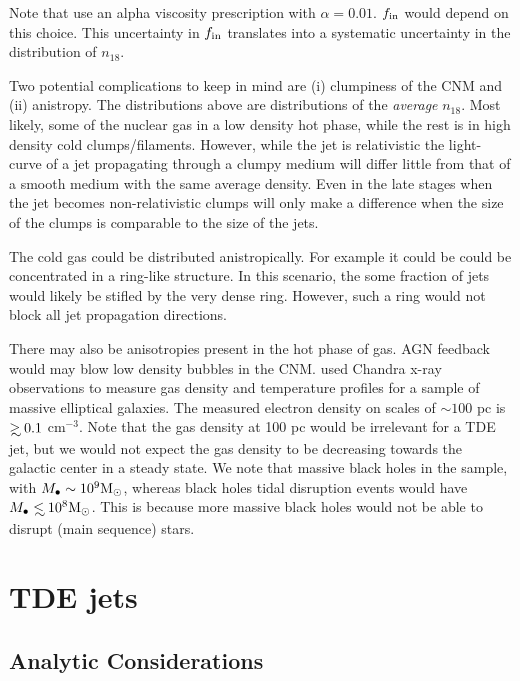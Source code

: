 \documentclass[usenatbib,fleqn]{mnras}
\newcommand\lsim{\mathrel{\rlap{\lower4pt\hbox{\hskip1pt$\sim$}}
    \raise1pt\hbox{$<$}}}
\newcommand\gsim{\mathrel{\rlap{\lower4pt\hbox{\hskip1pt$\sim$}}
    \raise1pt\hbox{$>$}}}
\newcommand{\Mbh}[1][]{M_{\bullet#1}}
\newcommand{\Msun}{{\rm M_\odot}}
\begin{document}
Note that \citet{Li+2013} use an alpha viscosity prescription with
$\alpha=0.01$.  $f_{\rm in}$ would depend on this choice. This
uncertainty in $f_{\rm in}$ translates into a systematic uncertainty
in the distribution of $n_{18}$. 
 
Two potential complications to keep in mind are (i) clumpiness of the
CNM and (ii) anistropy. The distributions above are distributions of
the {\it average} $n_{18}$.  Most likely, some of the nuclear gas in a
low density hot phase, while the rest is in high density cold
clumps/filaments.  However, while the jet is relativistic the
light-curve of a jet propagating through a clumpy medium will differ
little from that of a smooth medium with the same average
density. Even in the late stages when the jet becomes non-relativistic
clumps will only make a difference when the size of the clumps is
comparable to the size of the jets.

The cold gas could be distributed anistropically. For example it could
be could be concentrated in a ring-like structure. In this scenario,
the some fraction of jets would likely be stifled by the very dense
ring. However, such a ring would not block all jet propagation
directions. 

There may also be anisotropies present in the hot phase of gas. AGN
feedback would may blow low density bubbles in the
CNM. \citet{Russell+2013} used Chandra x-ray observations to measure
gas density and temperature profiles for a sample of massive
elliptical galaxies. The measured electron density on scales of $\sim
100$ pc is $\gsim 0.1$ cm$^{-3}$. Note that the gas density at 100 pc
would be irrelevant for a TDE jet, but we would not expect the gas
density to be decreasing towards the galactic center in a steady
state.  We note that massive black holes in the \citet{Russell+2013}
sample, with $\Mbh\sim 10^{9} \Msun$, whereas black holes tidal
disruption events would have $\Mbh\lsim 10^8 \Msun$. This is because
more massive black holes would not be able to disrupt (main sequence)
stars.



\section{TDE jets}
\label{sec:jet}

\subsection{Analytic Considerations}
\label{sec:analytic}
\end{document}
